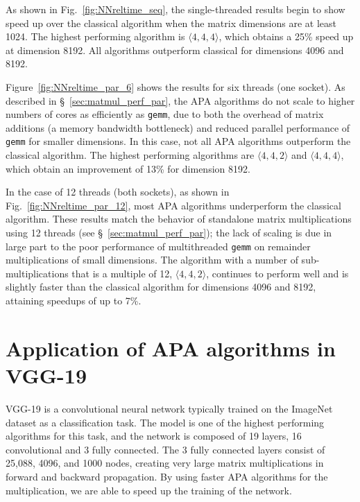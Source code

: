 \documentclass[manuscript]{acmart}
\newcommand{\dims}[1]{\langle #1 \rangle}
\begin{document}
As shown in Fig.~\ref{fig:NNreltime_seq}, the single-threaded results begin to show speed up over the classical algorithm when the matrix dimensions are at least 1024.
The highest performing algorithm is $\dims{4,4,4}$, which obtains a 25\% speed up at dimension 8192. 
All algorithms outperform classical for dimensions 4096 and 8192.

Figure~\ref{fig:NNreltime_par_6} shows the results for six threads (one socket).
As described in \S~\ref{sec:matmul_perf_par}, the APA algorithms do not scale to higher numbers of cores as efficiently as \texttt{gemm}, due to both the overhead of matrix additions (a memory bandwidth bottleneck) and reduced parallel performance of \texttt{gemm} for smaller dimensions.
In this case, not all APA algorithms outperform the classical algorithm.
The highest performing algorithms are $\dims{4,4,2}$ and $\dims{4,4,4}$, which obtain an improvement of 13\% for dimension 8192.

In the case of 12 threads (both sockets), as shown in Fig.~\ref{fig:NNreltime_par_12}, most APA algorithms underperform the classical algorithm.
These results match the behavior of standalone matrix multiplications using 12 threads (see \S~\ref{sec:matmul_perf_par}); the lack of scaling is due in large part to the poor performance of multithreaded \texttt{gemm} on remainder multiplications of small dimensions.
The algorithm with a number of sub-multiplications that is a multiple of 12, $\dims{4,4,2}$, continues to perform well and is slightly faster than the classical algorithm for dimensions 4096 and 8192, attaining speedups of up to 7\%.

\section{Application of APA algorithms in VGG-19}


VGG-19 \cite{SZ15} is a convolutional neural network typically trained on the ImageNet dataset as a classification task. 
The model is one of the highest performing algorithms for this task, and the network is composed of 19 layers, 16 convolutional and 3 fully connected. 
The 3 fully connected layers consist of 25{,}088, 4096, and 1000 nodes, creating very large matrix multiplications in forward and backward propagation. 
By using faster APA algorithms for the multiplication, we are able to speed up the training of the network. 
\end{document}
